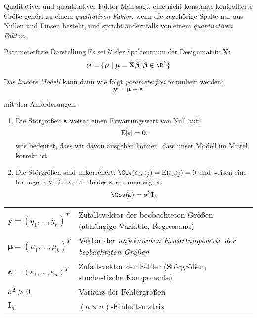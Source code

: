 \begin{defi}[Faktor]{Qualitativer und quantitativer Faktor}
    Man sagt, eine nicht konstante kontrollierte Größe gehört zu einem \emph{qualitativen Faktor}, wenn die zugehörige Spalte nur aus Nullen und Einsen besteht, und spricht andernfalls von einem \emph{quantitativen Faktor}.
\end{defi}

\begin{defi}{Parameterfreie Darstellung}
    Es sei $\mathcal{U}$ der Spaltenraum der Designmatrix $\mathbf{X}$:
    \[
        \mathcal{U} = \{ {\boldsymbol{\mu} \mid \boldsymbol{\mu} = \mathbf{X} \boldsymbol{\beta}, \boldsymbol{\beta} \in \R^k} \}
    \]

    Das \emph{lineare Modell} kann dann wie folgt \emph{parameterfrei} formuliert werden:
    \[
        \mathbf{y} = \boldsymbol{\mu} + \boldsymbol{\varepsilon}
    \]

    mit den Anforderungen:
    \begin{enumerate}
        \item Die Störgrößen ${\boldsymbol{\varepsilon}}$ weisen einen Erwartungswert von Null auf:
              \[
                  \operatorname{E} [{\boldsymbol{\varepsilon}}] = \mathbf{0},
              \]
              was bedeutet, dass wir davon ausgehen können, dass unser Modell im Mittel korrekt ist.
        \item Die Störgrößen sind unkorreliert: $\Cov(\varepsilon_i, \varepsilon_j) = \E(\varepsilon_i\varepsilon_j) = 0$ und weisen eine homogene Varianz auf.
              Beides zusammen ergibt:
              \[
                  \Cov({\boldsymbol{\varepsilon}}) = \sigma^2 \mathbf{I}_k
              \]
    \end{enumerate}

    \tcbline

    \begin{tabularx}{\linewidth}{lX}
        $\mathbf{y} = (y_1, \ldots, y_n)^T$                                     & Zufallsvektor der beobachteten Größen (abhängige Variable, Regressand) \\
        ${\boldsymbol{\mu}} = (\mu_1, \ldots, \mu_k)^T$                         & Vektor der \emph{unbekannten Erwartungswerte der beobachteten Größen}  \\
        ${\boldsymbol{\varepsilon}} = (\varepsilon_1, \ldots, \varepsilon_n)^T$ & Zufallsvektor der Fehler (Störgrößen, stochastische Komponente)        \\
        $\sigma^2 > 0$                                                          & Varianz der Fehlergrößen                                               \\
        $\mathbf{I}_n$                                                          & $(n \times n)$-Einheitsmatrix                                          \\
    \end{tabularx}
\end{defi}

